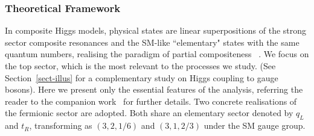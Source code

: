 \subsubsection*{Theoretical Framework}
\label{MCHM}
In composite Higgs models, physical states are linear superpositions of the strong sector composite resonances
and the SM-like ``elementary" states with the same quantum numbers, realising the paradigm of partial
compositeness ~\cite{KAPLAN1991259}.
We focus on the top sector,
which is the most relevant to the processes we study. (See Section~\ref{sect-illus} for a complementary study on Higgs coupling to gauge bosons).  Here we present only the essential features of the
 analysis, referring the reader to the companion
work~\cite{MCHMtthh} for further details. Two concrete
realisations of the fermionic sector are adopted. Both share an elementary sector denoted by $q_L$ and
$t_R$, transforming  as $(3,2,1/6)$ and $(3,1,2/3)$ under the SM gauge group.
%

